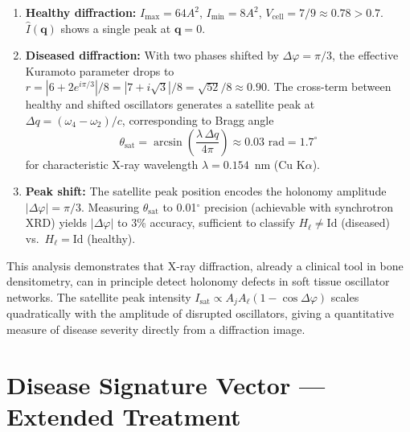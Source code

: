 \begin{enumerate}[label=\textbf{Step \arabic*:}, leftmargin=*]
    \item \textbf{Healthy diffraction:} $I_{\max} = 64A^2$,
          $I_{\min} = 8A^2$, $V_{\mathrm{cell}} = 7/9 \approx 0.78 > 0.7$.
          $\hat{I}(\mathbf{q})$ shows a single peak at $\mathbf{q}=0$.

    \item \textbf{Diseased diffraction:} With two phases shifted by
          $\Delta\varphi = \pi/3$, the effective Kuramoto parameter drops to
          $r = |6 + 2e^{i\pi/3}|/8 = |7 + i\sqrt{3}|/8 = \sqrt{52}/8
          \approx 0.90$.  The cross-term between healthy and shifted
          oscillators generates a satellite peak at
          $\Delta q = (\omega_4 - \omega_2)/c$, corresponding to Bragg angle
          \begin{equation}
              \theta_{\mathrm{sat}}
                  = \arcsin\!\left(\frac{\lambda\,\Delta q}{4\pi}\right)
                  \approx 0.03 \text{ rad} = 1.7^\circ
          \end{equation}
          for characteristic X-ray wavelength $\lambda = 0.154$~nm (Cu
          K$\alpha$).

    \item \textbf{Peak shift:} The satellite peak position encodes the
          holonomy amplitude $|\Delta\varphi| = \pi/3$.  Measuring $\theta_{\mathrm{sat}}$
          to 0.01$^\circ$ precision (achievable with synchrotron XRD) yields
          $|\Delta\varphi|$ to 3\% accuracy, sufficient to classify
          $H_\ell \neq \mathrm{Id}$ (diseased) vs.\ $H_\ell = \mathrm{Id}$
          (healthy).
\end{enumerate}

\begin{remark}
\label{rem:ch04-xrd-holonomy}
This analysis demonstrates that X-ray diffraction, already a clinical tool
in bone densitometry, can in principle detect holonomy defects in soft tissue
oscillator networks.  The satellite peak intensity $I_{\mathrm{sat}}
\propto A_j A_\ell (1 - \cos\Delta\varphi)$ scales quadratically with
the amplitude of disrupted oscillators, giving a quantitative measure of
disease severity directly from a diffraction image.
\end{remark}

\section{Disease Signature Vector --- Extended Treatment}
\label{sec:ch04-disease-signature-extended}

